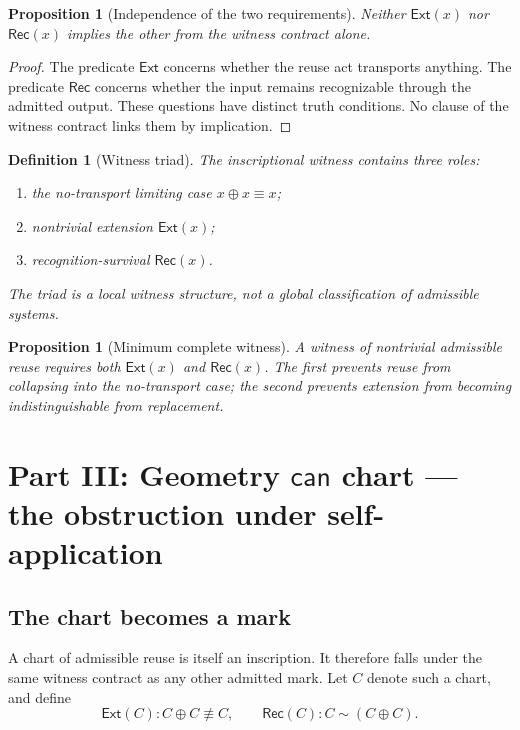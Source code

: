 \documentclass[11pt,letterpaper]{article}
\theoremstyle{constraintstyle}
\newtheorem{proposition}[theorem]{Proposition}
\newtheorem{definition}[theorem]{Definition}
\newcommand{\Can}{\mathsf{can}}
\newcommand{\Ext}{\mathsf{Ext}}
\newcommand{\Rec}{\mathsf{Rec}}
\begin{document}
\begin{proposition}[Independence of the two requirements]\label{prop:independence}
Neither $\Ext(x)$ nor $\Rec(x)$ implies the other from the witness contract alone.
\end{proposition}

\begin{proof}
The predicate $\Ext$ concerns whether the reuse act transports anything.  The predicate $\Rec$ concerns whether the input remains recognizable through the admitted output.  These questions have distinct truth conditions.  No clause of the witness contract links them by implication.
\end{proof}

\begin{definition}[Witness triad]
The inscriptional witness contains three roles:
\begin{enumerate}
  \item the no-transport limiting case $x\oplus x\equiv x$;
  \item nontrivial extension $\Ext(x)$;
  \item recognition-survival $\Rec(x)$.
\end{enumerate}
The triad is a local witness structure, not a global classification of admissible systems.
\end{definition}

\begin{proposition}[Minimum complete witness]
A witness of nontrivial admissible reuse requires both $\Ext(x)$ and $\Rec(x)$.  The first prevents reuse from collapsing into the no-transport case; the second prevents extension from becoming indistinguishable from replacement.
\end{proposition}

\section{Part III: Geometry \texorpdfstring{$\Can$}{can} chart --- the obstruction under self-application}\label{sec:geometry}

\subsection{The chart becomes a mark}

A chart of admissible reuse is itself an inscription.  It therefore falls under the same witness contract as any other admitted mark.  Let $C$ denote such a chart, and define
\[
\Ext(C): C\oplus C\not\equiv C,
\qquad
\Rec(C): C\sim(C\oplus C).
\]
\end{document}
